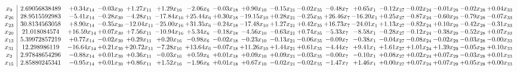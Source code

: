 \documentclass[9pt]{article}
\begin{document}
 \[\begin{array}{c| c c@{\hskip 2pt} c@{\hskip 2pt} c@{\hskip 2pt} c@{\hskip 2pt} c@{\hskip 2pt} c@{\hskip 2pt} c@{\hskip 2pt} c@{\hskip 2pt} c@{\hskip 2pt} c@{\hskip 2pt} c@{\hskip 2pt} c@{\hskip 2pt} c@{\hskip 2pt} c@{\hskip 2pt} c@{\hskip 2pt} c@{\hskip 2pt} }
 x_{9}   &  2.69056838489 & +  0.34 x_{14} & -0.03 x_{30} & +  1.27 x_{11} & +  1.29 x_{16} & -2.06 x_{6} & -0.03 x_{18} & +  0.90 x_{10} & -0.15 x_{21} & -0.02 x_{35} & -0.48 x_{7} & +  0.65 x_{1} & -0.12 x_{27} & -0.02 x_{24} & -0.01 x_{29} & -0.02 x_{28} & +  0.04 x_{33}\\
 x_{26}   &  28.9515592983 & -5.41 x_{14} & -0.28 x_{30} & -4.28 x_{11} & -17.84 x_{16} & + 25.44 x_{6} & +  0.30 x_{18} & -19.15 x_{10} & +  0.28 x_{21} & -0.25 x_{35} & + 26.46 x_{7} & -16.20 x_{1} & +  0.25 x_{27} & -0.87 x_{24} & -0.60 x_{29} & -0.79 x_{28} & -0.07 x_{33}\\
 x_{23}   &  30.8134563058 & +  8.90 x_{14} & -0.35 x_{30} & -12.04 x_{11} & -25.00 x_{16} & + 31.35 x_{6} & -0.24 x_{18} & -17.48 x_{10} & +  1.27 x_{21} & +  0.42 x_{35} & + 16.73 x_{7} & -24.01 x_{1} & +  1.13 x_{27} & -0.82 x_{24} & +  0.10 x_{29} & -0.42 x_{28} & -0.31 x_{33}\\
 x_{20}   &  21.018084574 & + 16.59 x_{14} & +  0.07 x_{30} & +  7.56 x_{11} & -10.94 x_{16} & +  5.34 x_{6} & -0.18 x_{18} & -4.56 x_{10} & -0.63 x_{21} & +  0.74 x_{35} & -5.33 x_{7} & -8.58 x_{1} & -0.28 x_{27} & -0.12 x_{24} & -0.38 x_{29} & -0.52 x_{28} & +  0.07 x_{33}\\
 x_{13}   &  5.39972857219 & +  0.77 x_{14} & -0.02 x_{30} & +  0.29 x_{11} & +  0.20 x_{16} & -0.98 x_{6} & -0.02 x_{18} & -0.23 x_{10} & -0.13 x_{21} & -0.06 x_{35} & -0.09 x_{7} & -0.38 x_{1} & -0.04 x_{27} & -0.08 x_{24} & -0.02 x_{29} & -0.03 x_{28} & -0.00 x_{33}\\
 x_{31}   &  12.298986119 & -16.64 x_{14} & +  0.21 x_{30} & + 20.72 x_{11} & -7.28 x_{16} & + 13.64 x_{6} & -0.07 x_{18} & + 11.26 x_{10} & +  1.44 x_{21} & +  0.61 x_{35} & -4.44 x_{7} & +  9.41 x_{1} & +  1.61 x_{27} & +  1.01 x_{24} & +  1.39 x_{29} & -0.05 x_{28} & +  0.10 x_{33}\\
 x_{2}   &  2.97848654296 & -0.88 x_{14} & +  0.01 x_{30} & +  0.36 x_{11} & -0.03 x_{16} & +  0.59 x_{6} & +  0.01 x_{18} & +  0.09 x_{10} & +  0.09 x_{21} & -0.03 x_{35} & -0.00 x_{7} & -0.10 x_{1} & +  0.08 x_{27} & +  0.02 x_{24} & +  0.07 x_{29} & -0.03 x_{28} & +  0.01 x_{33}\\
 x_{15}   &  2.85880245341 & -0.95 x_{14} & +  0.01 x_{30} & +  0.86 x_{11} & +  1.52 x_{16} & -1.96 x_{6} & +  0.01 x_{18} & +  0.67 x_{10} & -0.02 x_{21} & -0.02 x_{35} & -1.47 x_{7} & +  1.46 x_{1} & +  0.00 x_{27} & +  0.07 x_{24} & +  0.07 x_{29} & +  0.05 x_{28} & +  0.00 x_{33}\\

\end{array}\]
\end{document}
